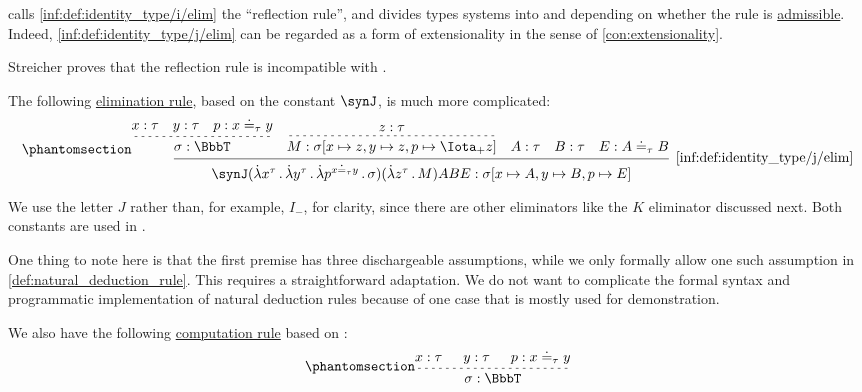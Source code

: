 \begin{definition}
\begin{thmenum}
     calls \ref{inf:def:identity_type/i/elim} the \enquote{reflection rule}, and divides types systems into  and  depending on whether the rule is \hyperref[con:inference_rule_admissibility]{admissible}. Indeed, \ref{inf:def:identity_type/j/elim} can be regarded as a form of extensionality in the sense of \cref{con:extensionality}.

    Streicher proves that the reflection rule is incompatible with .

     The following \hyperref[rem:type_theory_rule_classification/elim]{elimination rule}, based on the constant \( \synJ \), is much more complicated:
    \small
    \begin{equation*}\taglabel[\ensuremath{ =_-^J }]{inf:def:identity_type/j/elim}
      \begin{prooftree}[separation=1em]
        \hypo{ x: \tau }
        \hypo{ y: \tau }
        \hypo{ p: x \syneq_{\tau} y }
        \infer[dashed]3{ \sigma: \BbbT }

        \hypo{ z: \tau }
        \infer[dashed]1{M: \sigma[x \mapsto z, y \mapsto z, p \mapsto \Iota_+ z]}

        \hypo{ A: \tau }
        \hypo{ B: \tau }
        \hypo{ E: A \syneq_{\tau} B }

        \infer5[\ref{inf:def:identity_type/j/elim}]{ \synJ (\qabs {x^{\tau}} \qabs {y^{\tau}} \qabs {p^{x \syneq_{\tau} y}} \sigma) (\qabs {z^{\tau}} M) A B E: \sigma[x \mapsto A, y \mapsto B, p \mapsto E] }
      \end{prooftree}
    \end{equation*}
    \normalsize

    We use the letter \( J \) rather than, for example, \( I_- \), for clarity, since there are other eliminators like the \( K \) eliminator discussed next. Both constants are used in \cite[6]{Streicher1993IntensionalTypeTheory}.

    One thing to note here is that the first premise has three dischargeable assumptions, while we only formally allow one such assumption in \cref{def:natural_deduction_rule}. This requires a straightforward adaptation. We do not want to complicate the formal syntax and programmatic implementation of natural deduction rules because of one case that is mostly used for demonstration.

    We also have the following \hyperref[rem:type_theory_rule_classification/equality/comp]{computation rule} based on \cite[\S A.2.10]{UnivalentFoundationsProgram2013HoTT}:
    \small
    \begin{equation*}\taglabel[\ensuremath{ =_\beta^J }]{inf:def:identity_type/j/comp}
      \begin{prooftree}
        \hypo{ x: \tau }
        \hypo{ y: \tau }
        \hypo{ p: x \syneq_{\tau} y }
        \infer[dashed]3{\sigma: \BbbT}


\end{prooftree}
\end{equation*}
\end{thmenum}
\end{definition}
